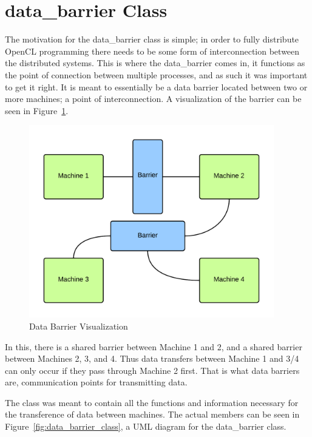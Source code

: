 \documentclass[../thesis.tex]{subfiles}
\begin{document}
\section{data\_barrier Class} %

The motivation for the data\_barrier class is simple; in order to fully distribute OpenCL programming there needs to be some form of interconnection between the distributed systems. This is where the data\_barrier comes in, it functions as the point of connection between multiple processes, and as such it was important to get it right. It is meant to essentially be a data barrier located between two or more machines; a point of interconnection. A visualization of the barrier can be seen in Figure~\ref{fig:data_barrier_vis}.

\begin{figure}[htbp]
  \centering
  \includegraphics[width=0.95\textwidth]{diagrams/data_barrier_visual.png}
  \caption{Data Barrier Visualization}
  \label{fig:data_barrier_vis}
\end{figure}

In this, there is a shared barrier between Machine 1 and 2, and a shared barrier between Machines 2, 3, and 4. Thus data transfers between Machine 1 and 3/4 can only occur if they pass through Machine 2 first. That is what data barriers are, communication points for transmitting data.

The class was meant to contain all the functions and information necessary for the transference of data between machines. The actual members can be seen in Figure~\ref{fig:data_barrier_class}, a UML diagram for the data\_barrier class.
\end{document}
